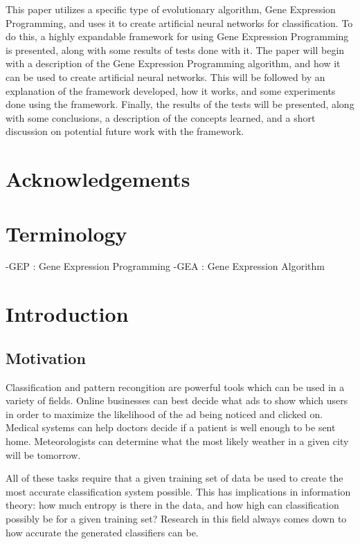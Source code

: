 \documentclass[a4paper,11pt]{report}
\begin{document}
This paper utilizes a specific type of evolutionary algorithm, Gene Expression Programming,
and uses it to create artificial neural networks for classification. To do this, a highly expandable 
framework for using Gene Expression Programming is presented, along with some results of tests done 
with it. The paper will begin with a description of the Gene Expression Programming algorithm, and 
how it can be used to create artificial neural networks. This will be followed by an explanation 
of the framework developed, how it works, and some experiments done using the framework. Finally,
the results of the tests will be presented, along with some conclusions, a description of the 
concepts learned, and a short discussion on potential future work with the framework. 


\chapter*{Acknowledgements}



\tableofcontents 

\listoffigures

\listoftables

\chapter{Terminology}
-GEP : Gene Expression Programming
-GEA : Gene Expression Algorithm


\chapter{Introduction}

\section{Motivation}

Classification and pattern recongition are powerful tools which can be used in a variety of 
fields. Online businesses can best decide what ads to show which users in order to maximize
the likelihood of the ad being noticed and clicked on. Medical systems can help doctors 
decide if a patient is well enough to be sent home. Meteorologists can determine what the 
most likely weather in a given city will be tomorrow. 

All of these tasks require that a given 
training set of data be used to create the most accurate classification system possible. 
This has implications in information theory: how much entropy is there in the data, and 
how high can classification possibly be for a given training set? Research in this field 
always comes down to how accurate the generated classifiers can be. 
\end{document}
